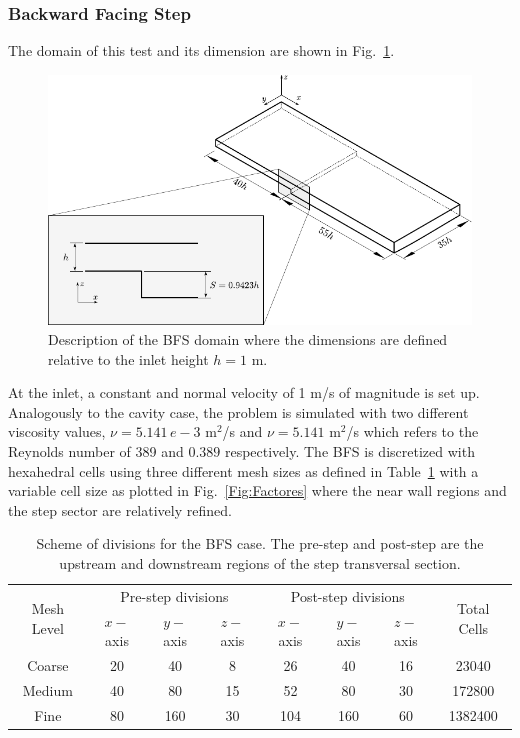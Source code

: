 \documentclass[final,3p,times,11pt,onecolumn]{myElsarticle}
\numberwithin{equation}{section}
\begin{document}
\subsubsection{Backward Facing Step}
The domain of this test and its dimension are shown in Fig.~\ref{Fig:Geometria3}.
\begin{figure}[t!!!]
\centering
\includegraphics[width=12cm]{fig/Cases/Geometria3.pdf}
\caption{Description of the BFS domain where the dimensions are defined relative to the inlet height $h = 1$ m.}
\label{Fig:Geometria3}
\end{figure}
At the inlet, a constant and normal velocity of 1 m/s of magnitude is set up. Analogously to the cavity case, the problem is simulated with two different viscosity values, $\nu = 5.141\,e-3$ m$^2$/s and $\nu = 5.141$ m$^2$/s which refers to the Reynolds number of 389 and $0.389$ respectively. The BFS is discretized with hexahedral cells using three different mesh sizes as defined in Table~\ref{Table:BFSMeshes} with a variable cell size as plotted in Fig.~\ref{Fig:Factores} where the near wall regions and the step sector are relatively refined.
\begin{table}[b!]
\centering
\begin{tabular}{cccccccc}
\hline 
\multirow{2}{1cm}{Mesh Level} & \multicolumn{3}{c}{Pre-step divisions} & \multicolumn{3}{c}{Post-step divisions} & \multirow{2}{1cm}{Total Cells} \\ 
\cline{2-7} 
&  $x-$axis &  $y-$axis &  $z-$axis &  $x-$axis &  $y-$axis &  $z-$axis \\ 
\hline 
Coarse & 20 & 40 & 8 & 26 & 40 & 16 & 23040 \\ 
Medium & 40 & 80 & 15 & 52 & 80 & 30 & 172800 \\ 
Fine & 80 & 160 & 30 & 104 & 160 & 60 & 1382400 \\ 
\hline 
\end{tabular}
\caption{Scheme of divisions for the BFS case. The pre-step and post-step are the upstream and downstream regions of the step transversal section.}
\label{Table:BFSMeshes}
\end{table}
\end{document}
